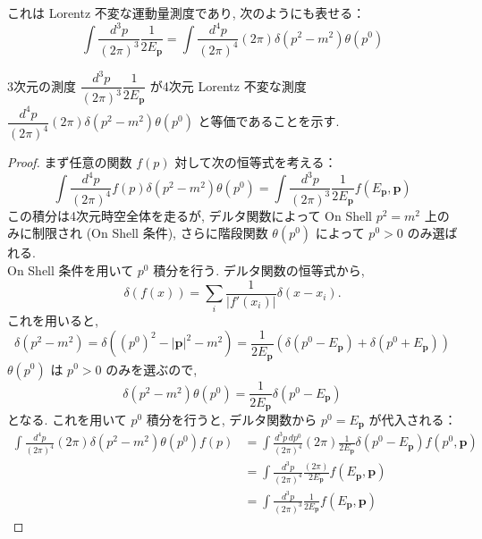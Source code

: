 \documentclass[a4paper,12pt]{article}
\begin{document}
これは Lorentz 不変な運動量測度であり, 次のようにも表せる：
\begin{equation*}
\int \frac{d^3p}{(2\pi)^3} \frac{1}{2E_{\mathbf{p}}}
= \int \frac{d^4p}{(2\pi)^4} (2\pi) \delta(p^2 - m^2) \theta(p^0) \tag{2.40}
\end{equation*}

\color{blue}
3次元の測度 $\dfrac{d^3 p}{(2\pi)^3}\dfrac{1}{2E_{\mathbf{p}}}$ が4次元 Lorentz 不変な測度 $\dfrac{d^4p}{(2\pi)^4} (2\pi) \delta(p^2 - m^2) \theta(p^0)$ と等価であることを示す.
\begin{proof}
まず任意の関数 $f(p)$ 対して次の恒等式を考える：
\begin{equation*}
    \int \frac{d^4 p}{(2\pi)^4} f(p) \delta(p^2 - m^2) \theta(p^0) = \int \frac{d^3 p}{(2\pi)^3} \frac{1}{2E_{\mathbf{p}}} f(E_{\mathbf{p}}, \mathbf{p}) \tag{2-3.t1}
\end{equation*}
この積分は4次元時空全体を走るが, デルタ関数によって On Shell $p^2 = m^2$ 上のみに制限され (On Shell 条件), さらに階段関数 $\theta(p^0)$ によって $p^0 > 0$ のみ選ばれる.\\
On Shell 条件を用いて $p^0$ 積分を行う. デルタ関数の恒等式から,
\begin{equation*}
    \delta(f(x)) = \sum_i \frac{1}{|f'(x_i)|} \delta(x - x_i). \tag{2-3.t2}
\end{equation*}
これを用いると,
\begin{equation*}
    \delta(p^2 - m^2) = \delta((p^0)^2 - |\mathbf{p}|^2 - m^2) = \frac{1}{2E_{\mathbf{p}}} (\delta(p^0 - E_{\mathbf{p}}) + \delta(p^0 + E_{\mathbf{p}})) \tag{2-3.t3}
\end{equation*}
$\theta(p^0)$ は $p^0 > 0$ のみを選ぶので,
\begin{equation*}
    \delta(p^2 - m^2) \theta(p^0) = \frac{1}{2E_{\mathbf{p}}} \delta(p^0 - E_{\mathbf{p}}) \tag{2-3.t4}
\end{equation*}
となる. これを用いて $p^0$ 積分を行うと, デルタ関数から $p^0 = E_{\mathbf{p}}$ が代入される：
\begin{align*}
    \int \frac{d^4 p}{(2\pi)^4}(2\pi) \delta(p^2 - m^2) \theta(p^0) f(p) &= \int \frac{d^3 p\, dp^0}{(2\pi)^4} (2\pi) \frac{1}{2E_{\mathbf{p}}} \delta(p^0 - E_{\mathbf{p}}) f(p^0, \mathbf{p}) \tag{2-3.t5} \\
    &= \int \frac{d^3 p}{(2\pi)^4} \frac{(2\pi)}{2E_{\mathbf{p}}}f(E_{\mathbf{p}}, \mathbf{p}) \tag{2-3.t6}\\
    &= \int \frac{d^3 p}{(2\pi)^3} \frac{1}{2E_{\mathbf{p}}} f(E_{\mathbf{p}}, \mathbf{p}) \tag{2-3.t7}
\end{align*}

\end{proof}
\end{document}
